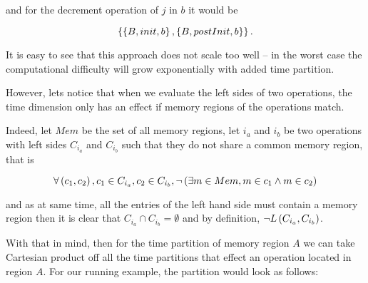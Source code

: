 \documentclass[..thesis.tex]{subfiles}
\begin{document}
and for the decrement operation of $j$ in $b$ it would be

\begin{equation*}
\left\lbrace \left\lbrace B, init, b \right\rbrace, \left\lbrace B, postInit, b \right\rbrace \right\rbrace \text{.}
\end{equation*}


It is easy to see that this approach does not scale too well -- in the worst case the computational difficulty will grow exponentially with added time partition.


However, lets notice that when we evaluate the left sides of two operations, the time dimension only has an effect if memory regions of the operations match. 

Indeed, let $Mem$ be the set of all memory regions, let $i_{a}$ and $i_{b}$ be two operations with left sides $C_{i_{a}}$ and $C_{i_{b}}$ such that they do not share a common memory region, that is

\begin{equation*}
\forall \left( c_1, c_2 \right), c_1 \in C_{i_a} , c_2 \in C_{i_b} , \lnot \left( \exists m \in Mem,  m \in c_1 \land m \in c_2 \right)
\end{equation*} 


and as at same time, all the entries of the left hand side must contain a memory region then it is clear that $C_{i_{a}} \cap C_{i_{b}} = \emptyset$ and by definition,  $\lnot L \left( C_{i_{a}}, C_{i_{b}} \right) $. 

With that in mind, then for the time partition of memory region $A$ we can take Cartesian product off all the time partitions that effect an operation located in region $A$. For our running example, the partition would look as follows:
\end{document}
